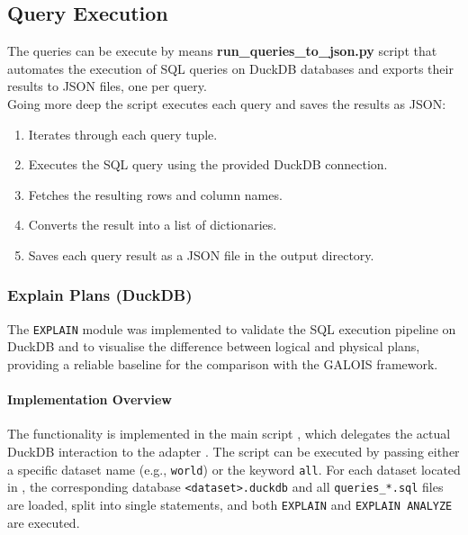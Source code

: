 \documentclass[12pt,a4paper]{article}
\begin{document}
\subsection{Query Execution}
The queries can be execute by means \textbf{run\_queries\_to\_json.py} script that automates the execution of SQL queries on DuckDB databases and exports their results to JSON files, one per query.\\
Going more deep the script executes each query and saves the results as JSON:

\begin{enumerate}
    \item Iterates through each query tuple.
    \item Executes the SQL query using the provided DuckDB connection.
    \item Fetches the resulting rows and column names.
    \item Converts the result into a list of dictionaries.
    \item Saves each query result as a JSON file in the output directory.
\end{enumerate}

\subsubsection{Explain Plans (DuckDB)}
\label{sec:explain-plans}

The \texttt{EXPLAIN} module was implemented to validate the SQL execution
pipeline on DuckDB and to visualise the difference between logical and
physical plans, providing a reliable baseline for the comparison with the
GALOIS framework. 

\paragraph{Implementation Overview}
The functionality is implemented in the main script
, which delegates the
actual DuckDB interaction to the adapter
. The script can be executed by passing
either a specific dataset name (e.g., \texttt{world}) or the keyword
\texttt{all}. For each dataset located in
, the corresponding database
\texttt{<dataset>.duckdb} and all \texttt{queries\_*.sql} files are loaded,
split into single statements, and both \texttt{EXPLAIN} and
\texttt{EXPLAIN ANALYZE} are executed.
\end{document}
